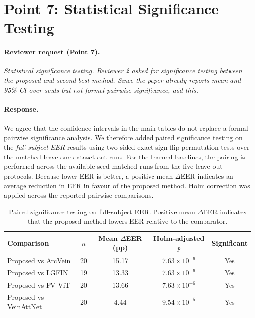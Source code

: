 \documentclass[11pt]{article}
\begin{document}
\section*{Point 7: Statistical Significance Testing}

\paragraph{Reviewer request (Point 7).}
\emph{Statistical significance testing. Reviewer 2 asked for significance testing between the proposed and second-best method. Since the paper already reports mean and 95\% CI over seeds but not formal pairwise significance, add this.}

\paragraph{Response.}
We agree that the confidence intervals in the main tables do not replace a formal pairwise significance analysis. We therefore added paired significance testing on the \emph{full-subject EER} results using two-sided exact sign-flip permutation tests over the matched leave-one-dataset-out runs. For the learned baselines, the pairing is performed across the available seed-matched runs from the five leave-out protocols. Because lower EER is better, a positive mean $\Delta$EER indicates an average reduction in EER in favour of the proposed method. Holm correction was applied across the reported pairwise comparisons.

\begin{table}[ht!]
    \centering
    \begin{tabular}{|l|c|c|c|c|}
        \hline
        Comparison & $n$ & Mean $\Delta$EER (pp) & Holm-adjusted $p$ & Significant \\
        \hline
        Proposed vs ArcVein & 20 & 15.17 & $7.63 \times 10^{-6}$ & Yes \\
        Proposed vs LGFIN & 19 & 13.33 & $7.63 \times 10^{-6}$ & Yes \\
        Proposed vs FV-ViT & 20 & 13.66 & $7.63 \times 10^{-6}$ & Yes \\
        Proposed vs VeinAttNet & 20 & 4.44 & $9.54 \times 10^{-5}$ & Yes \\
        \hline
    \end{tabular}
    \caption{Paired significance testing on full-subject EER. Positive mean $\Delta$EER indicates that the proposed method lowers EER relative to the comparator.}
    \label{tab:rebuttal_significance}
\end{table}
\end{document}
